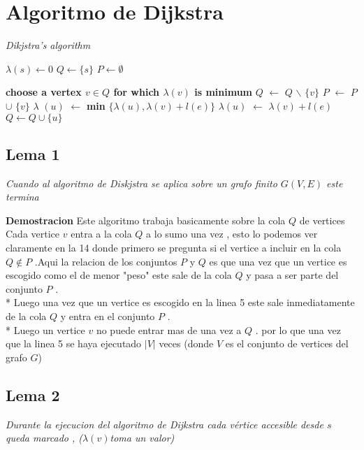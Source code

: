 \documentclass{article}
\begin{document}
    
    \section*{Algoritmo de Dijkstra}

    \begin{algorithm}[h]
        \caption{\textit{Dikjstra's algorithm}}
        \begin{algorithmic}[1]      
          \State $\lambda \left(s \right) \leftarrow 0 $
          \State $Q \leftarrow \{s\}$
          \State $P \leftarrow \emptyset $

                \State \textbf{choose a vertex $v \in Q $ for which $\lambda \left(v\right)$ is minimum}
                \State $Q$ $\leftarrow$ $Q$ $\backslash$ $\{v\}$
                \State $P$ $\leftarrow$ $P$ $\cup$  $\{v\}$
                        \State $\lambda $ $\left(u\right)$ $\leftarrow $ \textbf{min} $\{ \lambda \left(u\right) , \lambda \left(v\right) + l \left(e\right)\}$ 
                    \Else
                            \State $\lambda\left(u\right)$ $ \leftarrow $ $ \lambda \left(v\right) + l \left(e\right)$
                            \State $ Q \leftarrow  Q \cup \{u\}$
                        \EndIf
                    \EndIf 
                \EndFor
          \EndWhile 
        \end{algorithmic}
    \end{algorithm}

    
    \subsection*{Lema 1}
        \textit{Cuando al algoritmo de Diskjstra se aplica sobre un grafo finito $G\left(V,E\right)$ este termina} 

    \textbf{Demostracion } 
        Este algoritmo trabaja basicamente sobre la cola $Q$ de vertices 
        Cada vertice $v$ entra a la cola $Q$ a lo sumo una vez , esto lo podemos ver claramente en la 14 donde primero se pregunta si el vertice a incluir en 
        la cola $Q \notin P $ .Aqui la relacion de los conjuntos $P$ y $Q$ es que una vez que un vertice es escogido como el de menor "peso" este sale de la cola 
        $Q$ y pasa a ser parte del conjunto $P$ . 
        \\*
        Luego una vez que un vertice es escogido en la linea 5 este sale inmediatamente de la cola $Q$ y entra en el conjunto $P$ . 
        \\*
        Luego un vertice $v$ no puede entrar mas de una vez a $Q$ . por lo que una vez que la linea 5 se haya ejecutado $|V| $ veces (donde $V$  es el conjunto de vertices del grafo $G$)
    
    \subsection*{Lema 2} 
        \textit{Durante la ejecucion del algoritmo de Dijkstra cada v\'ertice accesible desde $s$ queda marcado , ($\lambda (v)$toma un valor) }
\end{document}
